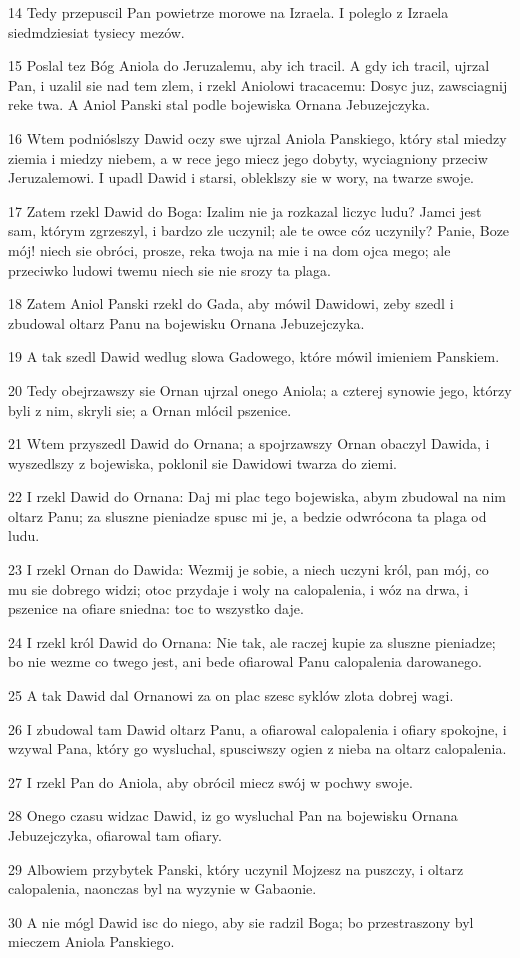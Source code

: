 \par 14 Tedy przepuscil Pan powietrze morowe na Izraela. I poleglo z Izraela siedmdziesiat tysiecy mezów.
\par 15 Poslal tez Bóg Aniola do Jeruzalemu, aby ich tracil. A gdy ich tracil, ujrzal Pan, i uzalil sie nad tem zlem, i rzekl Aniolowi tracacemu: Dosyc juz, zawsciagnij reke twa. A Aniol Panski stal podle bojewiska Ornana Jebuzejczyka.
\par 16 Wtem podnióslszy Dawid oczy swe ujrzal Aniola Panskiego, który stal miedzy ziemia i miedzy niebem, a w rece jego miecz jego dobyty, wyciagniony przeciw Jeruzalemowi. I upadl Dawid i starsi, obleklszy sie w wory, na twarze swoje.
\par 17 Zatem rzekl Dawid do Boga: Izalim nie ja rozkazal liczyc ludu? Jamci jest sam, którym zgrzeszyl, i bardzo zle uczynil; ale te owce cóz uczynily? Panie, Boze mój! niech sie obróci, prosze, reka twoja na mie i na dom ojca mego; ale przeciwko ludowi twemu niech sie nie srozy ta plaga.
\par 18 Zatem Aniol Panski rzekl do Gada, aby mówil Dawidowi, zeby szedl i zbudowal oltarz Panu na bojewisku Ornana Jebuzejczyka.
\par 19 A tak szedl Dawid wedlug slowa Gadowego, które mówil imieniem Panskiem.
\par 20 Tedy obejrzawszy sie Ornan ujrzal onego Aniola; a czterej synowie jego, którzy byli z nim, skryli sie; a Ornan mlócil pszenice.
\par 21 Wtem przyszedl Dawid do Ornana; a spojrzawszy Ornan obaczyl Dawida, i wyszedlszy z bojewiska, poklonil sie Dawidowi twarza do ziemi.
\par 22 I rzekl Dawid do Ornana: Daj mi plac tego bojewiska, abym zbudowal na nim oltarz Panu; za sluszne pieniadze spusc mi je, a bedzie odwrócona ta plaga od ludu.
\par 23 I rzekl Ornan do Dawida: Wezmij je sobie, a niech uczyni król, pan mój, co mu sie dobrego widzi; otoc przydaje i woly na calopalenia, i wóz na drwa, i pszenice na ofiare sniedna: toc to wszystko daje.
\par 24 I rzekl król Dawid do Ornana: Nie tak, ale raczej kupie za sluszne pieniadze; bo nie wezme co twego jest, ani bede ofiarowal Panu calopalenia darowanego.
\par 25 A tak Dawid dal Ornanowi za on plac szesc syklów zlota dobrej wagi.
\par 26 I zbudowal tam Dawid oltarz Panu, a ofiarowal calopalenia i ofiary spokojne, i wzywal Pana, który go wysluchal, spusciwszy ogien z nieba na oltarz calopalenia.
\par 27 I rzekl Pan do Aniola, aby obrócil miecz swój w pochwy swoje.
\par 28 Onego czasu widzac Dawid, iz go wysluchal Pan na bojewisku Ornana Jebuzejczyka, ofiarowal tam ofiary.
\par 29 Albowiem przybytek Panski, który uczynil Mojzesz na puszczy, i oltarz calopalenia, naonczas byl na wyzynie w Gabaonie.
\par 30 A nie mógl Dawid isc do niego, aby sie radzil Boga; bo przestraszony byl mieczem Aniola Panskiego.

